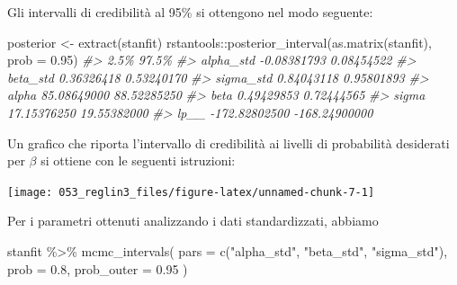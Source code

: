 \documentclass[
]{memoir}
\newenvironment{Shaded}{\begin{snugshade}}{\end{snugshade}}
\newcommand{\AttributeTok}[1]{\textcolor[rgb]{0.77,0.63,0.00}{#1}}
\newcommand{\CommentTok}[1]{\textcolor[rgb]{0.56,0.35,0.01}{\textit{#1}}}
\newcommand{\FloatTok}[1]{\textcolor[rgb]{0.00,0.00,0.81}{#1}}
\newcommand{\FunctionTok}[1]{\textcolor[rgb]{0.00,0.00,0.00}{#1}}
\newcommand{\NormalTok}[1]{#1}
\newcommand{\OtherTok}[1]{\textcolor[rgb]{0.56,0.35,0.01}{#1}}
\newcommand{\SpecialCharTok}[1]{\textcolor[rgb]{0.00,0.00,0.00}{#1}}
\newcommand{\StringTok}[1]{\textcolor[rgb]{0.31,0.60,0.02}{#1}}
\begin{document}
Gli intervalli di credibilità al 95\% si ottengono nel modo seguente:

\begin{Shaded}
\begin{Highlighting}[]
\NormalTok{posterior }\OtherTok{\textless{}{-}} \FunctionTok{extract}\NormalTok{(stanfit)}
\NormalTok{rstantools}\SpecialCharTok{::}\FunctionTok{posterior\_interval}\NormalTok{(}\FunctionTok{as.matrix}\NormalTok{(stanfit), }\AttributeTok{prob =} \FloatTok{0.95}\NormalTok{)}
\CommentTok{\#\textgreater{}                    2.5\%         97.5\%}
\CommentTok{\#\textgreater{} alpha\_std   {-}0.08381793    0.08454522}
\CommentTok{\#\textgreater{} beta\_std     0.36326418    0.53240170}
\CommentTok{\#\textgreater{} sigma\_std    0.84043118    0.95801893}
\CommentTok{\#\textgreater{} alpha       85.08649000   88.52285250}
\CommentTok{\#\textgreater{} beta         0.49429853    0.72444565}
\CommentTok{\#\textgreater{} sigma       17.15376250   19.55382000}
\CommentTok{\#\textgreater{} lp\_\_      {-}172.82802500 {-}168.24900000}
\end{Highlighting}
\end{Shaded}

Un grafico che riporta l'intervallo di credibilità ai livelli di probabilità desiderati per \(\beta\) si ottiene con le seguenti istruzioni:

\begin{Shaded}
\end{Shaded}

\begin{center}\texttt{[image: 053\_reglin3\_files/figure-latex/unnamed-chunk-7-1]} \end{center}

Per i parametri ottenuti analizzando i dati standardizzati, abbiamo

\begin{Shaded}
\begin{Highlighting}[]
\NormalTok{stanfit }\SpecialCharTok{\%\textgreater{}\%}
  \FunctionTok{mcmc\_intervals}\NormalTok{(}
    \AttributeTok{pars =} \FunctionTok{c}\NormalTok{(}\StringTok{"alpha\_std"}\NormalTok{, }\StringTok{"beta\_std"}\NormalTok{, }\StringTok{"sigma\_std"}\NormalTok{), }
    \AttributeTok{prob =} \FloatTok{0.8}\NormalTok{,}
    \AttributeTok{prob\_outer =} \FloatTok{0.95}
\NormalTok{  )}
\end{Highlighting}
\end{Shaded}
\end{document}
